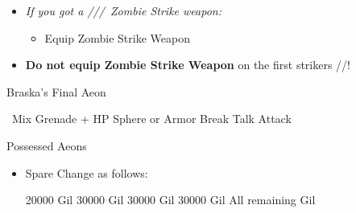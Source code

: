 \begin{equip}
    \begin{itemize}
        \item \textit{If you got a \lulu/\kimahri/\wakka/\rikku\ Zombie Strike weapon:}
        \begin{itemize}
            \item Equip Zombie Strike Weapon
        \end{itemize}
        \item \textbf{Do not equip Zombie Strike Weapon} on the first strikers \tidus/\auron/\yuna !
    \end{itemize}
\end{equip}
\begin{battle}[180000]{Braska's Final Aeon}
    \begin{itemize}
        \switch{\yuna}{\rikku}
        \rikkuf \od\ Mix Grenade + HP Sphere or Armor Break
        \tidusf Talk
        \switch{\auron}{\yuna}
        \summon{\bahamut}
        \bahamutf Attack
    \end{itemize}
\end{battle}
\begin{battle}{Possessed Aeons}
    \begin{itemize}
        \item Spare Change as follows:
        \begin{itemize}
            \valeforf \num{20000} Gil
            \ifritf \num{30000} Gil
            \ixionf \num{30000} Gil
            \shivaf \num{30000} Gil
            \bahamutf All remaining Gil
        \end{itemize}
    \end{itemize}
\end{battle}
\colend
